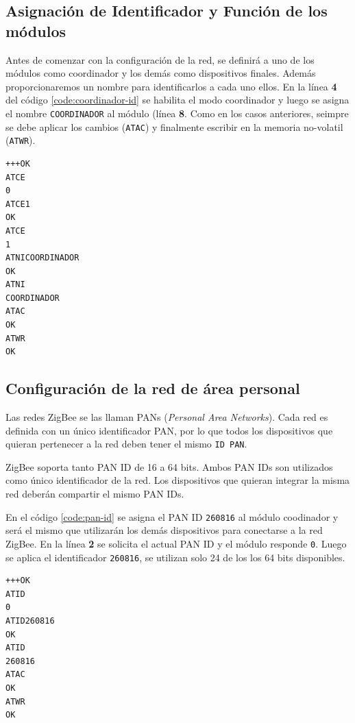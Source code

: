\documentclass[11pt,oneside,spanish,a4paper]{article}
\begin{document}
\subsection{Asignación de Identificador y Función de los módulos}

Antes de comenzar con la configuración de la red, se definirá a uno de
los módulos como coordinador y los demás como dispositivos
finales. Además proporcionaremos un nombre para identificarlos a cada
uno ellos. En la línea \textbf{4} del código
\ref{code:coordinador-id}  se habilita el modo coordinador y luego se
asigna el nombre \texttt{COORDINADOR} al módulo (línea \textbf{8}.
 Como en los casos anteriores, seimpre se debe aplicar los cambios (\texttt{ATAC}) y
finalmente escribir en la memoria no-volatil (\texttt{ATWR}).
\begin{lstlisting}[emph={+++,ATCE,ATCE1,ATWR,ATAC,ATNI,ATCOORDINADOR},
    emphstyle={\color{blue}}, caption={Obtención del \textsl{seral
number}.}, label=code:coordinador-id]
+++OK
ATCE
0
ATCE1
OK
ATCE
1
ATNICOORDINADOR
OK
ATNI
COORDINADOR
ATAC
OK
ATWR
OK
\end{lstlisting}  

\subsection[Configuración PAN]{Configuración de la red de área personal}

Las redes ZigBee se las llaman PANs (\textsl{Personal Area
  Networks}). Cada red es definida con un único identificador PAN, por
lo que todos los dispositivos que quieran pertenecer a la red deben
tener el mismo \texttt{ID PAN}. 

ZigBee soporta tanto PAN ID de 16 a 64 bits. Ambos PAN IDs son
utilizados como único identificador de la red. Los dispositivos que
quieran integrar la misma red deberán compartir el mismo PAN IDs. 

En el código \ref{code:pan-id} se asigna el PAN ID \texttt{260816} al
módulo coodinador y será el mismo que utilizarán los demás
dispositivos para conectarse a la red ZigBee. En la línea \textbf{2}
se solicita el actual PAN ID y el módulo responde \texttt{0}. Luego se
aplica el identificador \texttt{260816}, se utilizan solo 24 de los
los 64 bits disponibles. 

\begin{lstlisting}[emph={+++,ATWR,ATAC,ATID,ATID260816},
    emphstyle={\color{blue}}, caption={Obtención del \textsl{seral
number}.}, label=code:coordinador-id]
+++OK
ATID
0
ATID260816
OK
ATID
260816
ATAC
OK
ATWR
OK
\end{lstlisting}  
\end{document}
